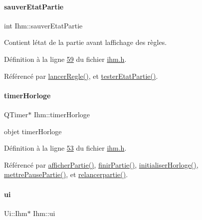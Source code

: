 \paragraph{\texorpdfstring{sauver\+Etat\+Partie}{sauverEtatPartie}}
{\footnotesize\ttfamily int Ihm\+::sauver\+Etat\+Partie\hspace{0.3cm}{\ttfamily [private]}}



Contient l\textquotesingle{}état de la partie avant l\textquotesingle{}affichage des règles. 



Définition à la ligne \hyperlink{ihm_8h_source_l00059}{59} du fichier \hyperlink{ihm_8h_source}{ihm.\+h}.



Référencé par \hyperlink{ihm_8cpp_source_l00623}{lancer\+Regle()}, et \hyperlink{ihm_8cpp_source_l00641}{tester\+Etat\+Partie()}.

\mbox{\label{class_ihm_a21ea35b212966fa2805241ea6237d351}} 
\paragraph{\texorpdfstring{timer\+Horloge}{timerHorloge}}
{\footnotesize\ttfamily Q\+Timer$\ast$ Ihm\+::timer\+Horloge\hspace{0.3cm}{\ttfamily [private]}}



objet timer\+Horloge 



Définition à la ligne \hyperlink{ihm_8h_source_l00053}{53} du fichier \hyperlink{ihm_8h_source}{ihm.\+h}.



Référencé par \hyperlink{ihm_8cpp_source_l00333}{afficher\+Partie()}, \hyperlink{ihm_8cpp_source_l00365}{finir\+Partie()}, \hyperlink{ihm_8cpp_source_l00553}{initialiser\+Horloge()}, \hyperlink{ihm_8cpp_source_l00519}{mettre\+Pause\+Partie()}, et \hyperlink{ihm_8cpp_source_l00539}{relancerpartie()}.

\mbox{\label{class_ihm_a0ac5f47856566ceeeca1720109bf70ea}} 
\paragraph{\texorpdfstring{ui}{ui}}
{\footnotesize\ttfamily Ui\+::\+Ihm$\ast$ Ihm\+::ui\hspace{0.3cm}{\ttfamily [private]}}



